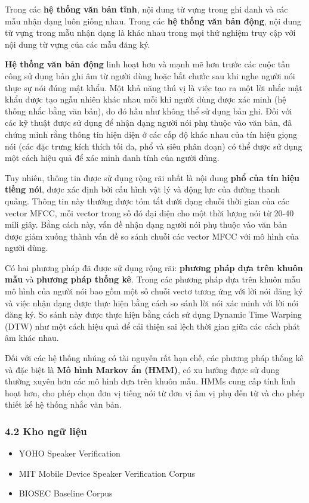 \documentclass{article}
\begin{document}
	Trong các \textbf{hệ thống văn bản tĩnh}, nội dung từ vựng trong ghi danh và các mẫu nhận dạng luôn giống nhau. Trong các \textbf{hệ thống văn bản động}, nội dung từ vựng trong mẫu nhận dạng là khác nhau trong mọi thử nghiệm truy cập với nội dung từ vựng của các mẫu đăng ký.
	
	\textbf{Hệ thống văn bản động} linh hoạt hơn và mạnh mẽ hơn trước các cuộc tấn công sử dụng bản ghi âm từ người dùng hoặc bắt chước sau khi nghe người nói thực sự nói đúng mật khẩu. Một khả năng thú vị là việc tạo ra một lời nhắc mật khẩu được tạo ngẫu nhiên khác nhau mỗi khi người dùng được xác minh (hệ thống nhắc bằng văn bản), do đó hầu như không thể sử dụng bản ghi. Đối với các kỹ thuật được sử dụng để nhận dạng người nói phụ thuộc vào văn bản, đã chứng minh rằng thông tin hiện diện ở các cấp độ khác nhau của tín hiệu giọng nói (các đặc trưng kích thích tối đa, phổ và siêu phân đoạn) có thể được sử dụng một cách hiệu quả để xác minh danh tính của người dùng. 
	
	Tuy nhiên, thông tin được sử dụng rộng rãi nhất là nội dung \textbf{phổ của tín hiệu tiếng nói}, được xác định bởi cấu hình vật lý và động lực của đường thanh quảng. Thông tin này thường được tóm tắt dưới dạng chuỗi thời gian của các vector MFCC, mỗi vector trong số đó đại diện cho một thời lượng nói từ 20-40 mili giây. Bằng cách này, vấn đề nhận dạng người nói phụ thuộc vào văn bản được giảm xuống thành vấn đề so sánh chuỗi các vector MFCC với mô hình của người dùng. 
	
	Có hai phương pháp đã được sử dụng rộng rãi: \textbf{phương pháp dựa trên khuôn mẫu} và \textbf{phương pháp thống kê}. Trong các phương pháp dựa trên khuôn mẫu mô hình của người nói bao gồm một số chuỗi vectơ tương ứng với lời nói đăng ký và việc nhận dạng được thực hiện bằng cách so sánh lời nói xác minh với lời nói đăng ký. So sánh này được thực hiện bằng cách sử dụng Dynamic Time Warping (DTW) như một cách hiệu quả để cải thiện sai lệch thời gian giữa các cách phát âm khác nhau. 
	
	Đối với các hệ thống nhúng có tài nguyên rất hạn chế, các phương pháp thống kê và đặc biệt là \textbf{Mô hình Markov ẩn (HMM)}, có xu hướng được sử dụng thường xuyên hơn các mô hình dựa trên khuôn mẫu. HMMs cung cấp tính linh hoạt hơn, cho phép chọn đơn vị tiếng nói từ đơn vị âm vị phụ đến từ và cho phép thiết kế hệ thống nhắc văn bản.
	
	\subsubsection{4.2 Kho ngữ liệu}
	\begin{itemize}
		\item YOHO Speaker Verification
		\item MIT Mobile Device Speaker Verification Corpus
		\item BIOSEC Baseline Corpus
	\end{itemize}
	
\end{document}
